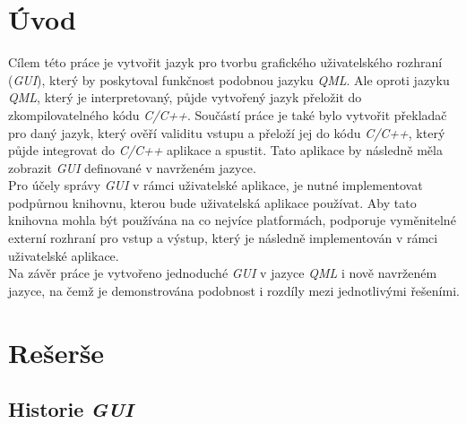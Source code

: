 \documentclass[11pt,twoside,a4paper]{book}
\begin{document}
\chapter{\label{CH:Intro}Úvod}
Cílem této práce je vytvořit jazyk pro tvorbu grafického uživatelského rozhraní (\textit{GUI}), který by poskytoval funkčnost podobnou jazyku \textit{QML}. Ale oproti jazyku \textit{QML}, který je interpretovaný, půjde vytvořený jazyk přeložit do zkompilovatelného kódu \textit{C/C++}. Součástí práce je také bylo vytvořit překladač pro daný jazyk, který ověří validitu vstupu a přeloží jej do kódu \textit{C/C++}, který půjde integrovat do \textit{C/C++} aplikace a spustit. Tato aplikace by následně měla zobrazit \textit{GUI} definované v navrženém jazyce.\\
Pro účely správy \textit{GUI} v rámci uživatelské aplikace, je nutné implementovat podpůrnou knihovnu, kterou bude uživatelská aplikace používat. Aby tato knihovna mohla být používána na co nejvíce platformách, podporuje vyměnitelné externí rozhraní pro vstup a výstup, který je následně implementován v rámci uživatelské aplikace.\\
Na závěr práce je vytvořeno jednoduché \textit{GUI} v jazyce \textit{QML} i nově navrženém jazyce, na čemž je demonstrována podobnost i rozdíly mezi jednotlivými řešeními.





\chapter{\label{CH:Rash}Rešerše}

\section{\label{SEC:history}Historie \textit{GUI}}
\end{document}
